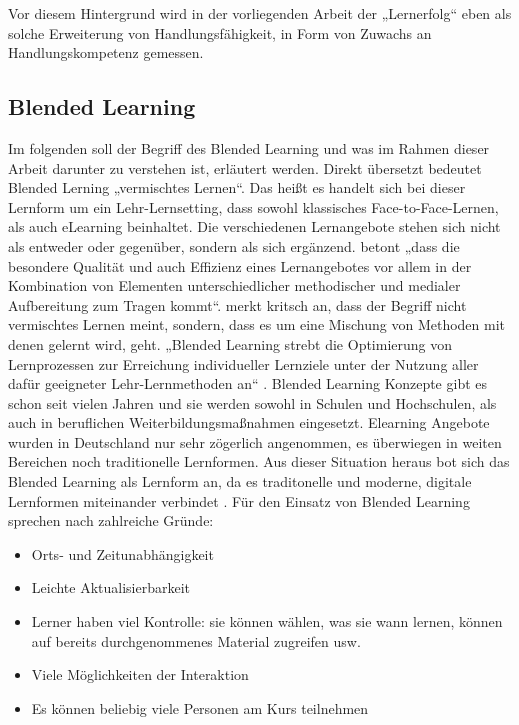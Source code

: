 \documentclass[12pt,smallheadings, bibliography=totoc]{scrartcl}
\begin{document}
Vor diesem Hintergrund wird in der vorliegenden Arbeit der „Lernerfolg``
eben als solche Erweiterung von Handlungsfähigkeit, in Form von Zuwachs
an Handlungskompetenz gemessen.

\subsection{Blended Learning}\label{blended-learning}

Im folgenden soll der Begriff des Blended Learning und was im Rahmen
dieser Arbeit darunter zu verstehen ist, erläutert werden. Direkt
übersetzt bedeutet Blended Lerning „vermischtes Lernen``. Das heißt es
handelt sich bei dieser Lernform um ein Lehr-Lernsetting, dass sowohl
klassisches Face-to-Face-Lernen, als auch eLearning beinhaltet. Die
verschiedenen Lernangebote stehen sich nicht als entweder oder
gegenüber, sondern als sich ergänzend.
\textcite[3]{kerres2001multimediale} betont „dass die besondere Qualität
und auch Effizienz eines Lernangebotes vor allem in der Kombination von
Elementen unterschiedlicher methodischer und medialer Aufbereitung zum
Tragen kommt``. \textcite[45]{ehlers2011qualitat} merkt kritsch an, dass
der Begriff nicht vermischtes Lernen meint, sondern, dass es um eine
Mischung von Methoden mit denen gelernt wird, geht. „Blended Learning
strebt die Optimierung von Lernprozessen zur Erreichung individueller
Lernziele unter der Nutzung aller dafür geeigneter Lehr-Lernmethoden
an`` \parencite[46]{ehlers2011qualitat}. Blended Learning Konzepte gibt
es schon seit vielen Jahren und sie werden sowohl in Schulen und
Hochschulen, als auch in beruflichen Weiterbildungsmaßnahmen eingesetzt.
Elearning Angebote wurden in Deutschland nur sehr zögerlich angenommen,
es überwiegen in weiten Bereichen noch traditionelle Lernformen. Aus
dieser Situation heraus bot sich das Blended Learning als Lernform an,
da es traditonelle und moderne, digitale Lernformen miteinander
verbindet \parencite{Maihack2015}. Für den Einsatz von Blended Learning
sprechen nach \textcite{thomas2000evaluating} zahlreiche Gründe:

\begin{itemize}
\item
  Orts- und Zeitunabhängigkeit
\item
  Leichte Aktualisierbarkeit
\item
  Lerner haben viel Kontrolle: sie können wählen, was sie wann lernen,
  können auf bereits durchgenommenes Material zugreifen usw.
\item
  Viele Möglichkeiten der Interaktion
\item
  Es können beliebig viele Personen am Kurs teilnehmen
\end{itemize}
\end{document}
